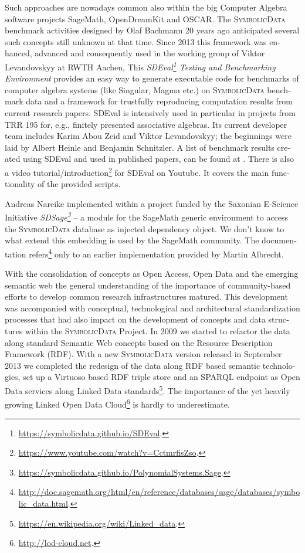 \documentclass[11pt]{article}
\def\SD{\textsc{SymbolicData}}
\begin{document}
\begin{otherlanguage}{english}
\begin{multicols}{2}
Such approaches are nowadays common also within the big Computer Algebra
software projects SageMath, OpenDreamKit and OSCAR. The {\SD} benchmark
activities designed by Olaf Bachmann 20 years ago anticipated several such
concepts still unknown at that time. Since 2013 this framework was enhanced,
advanced and consequently used in the working group of Viktor Levandovskyy at
RWTH Aachen, This
\emph{SDEval\footnote{\url{https://symbolicdata.github.io/SDEval}.}  Testing
  and Benchmarking Environment} provides an easy way to generate executable
code for benchmarks of computer algebra systems (like Singular, Magma etc.) on
{\SD} benchmark data and a framework for trustfully reproducing computation
results from current research papers.  SDEval is intensively used in particular
in projects from TRR 195 for, e.g., finitely presented associative
algebras. Its current developer team includes Karim Abou Zeid and Viktor
Levandovskyy; the beginnings were laid by Albert Heinle and Benjamin
Schnitzler.  A list of benchmark results created using SDEval and used in
published papers, can be found at \cite{heinle-web}.  There is also a video
tutorial/introduction\footnote{\url{https://www.youtube.com/watch?v=CctmrfisZso}.}
for SDEval on Youtube. It covers the main functionality of the provided
scripts.

Andreas Nareike implemented within a project funded by the Saxonian E-Science
Initiative
\emph{SDSage\footnote{\url{https://symbolicdata.github.io/PolynomialSystems.Sage}.}}
-- a module for the SageMath \cite{sagemath} generic environment to access the
{\SD} database as injected dependency object.  We don't know to what extend
this embedding is used by the SageMath community. The documentation
refers\footnote{\url{http://doc.sagemath.org/html/en/reference/databases/sage/databases/symbolic_data.html}.}
only to an earlier implementation provided by Martin Albrecht.


With the consolidation of concepts as Open Access, Open Data and the emerging
semantic web the general understanding of the importance of community-based
efforts to develop common research infrastructures matured.  This development
was accompanied with conceptual, technological and architectural
standardization processes that had also impact on the development of concepts
and data structures within the {\SD} Project.  In 2009 we started to refactor
the data along standard Semantic Web concepts based on the Resource Description
Framework (RDF).  With a new {\SD} version released in September 2013 we
completed the redesign of the data along RDF based semantic technologies, set
up a Virtuoso based RDF triple store and an SPARQL endpoint as Open Data
services along Linked Data
standards\footnote{\url{https://en.wikipedia.org/wiki/Linked_data}.}. The
importance of the yet heavily growing Linked Open Data
Cloud\footnote{\url{http://lod-cloud.net}.} is hardly to underestimate.


\end{multicols}
\end{otherlanguage}
\end{document}
